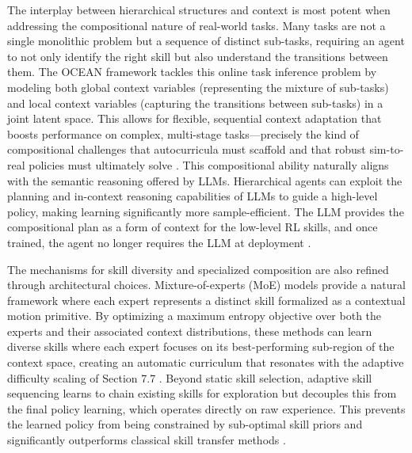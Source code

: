 \documentclass[11pt]{article}
\begin{document}
The interplay between hierarchical structures and context is most potent when addressing the compositional nature of real-world tasks. Many tasks are not a single monolithic problem but a sequence of distinct sub-tasks, requiring an agent to not only identify the right skill but also understand the transitions between them. The OCEAN framework tackles this online task inference problem by modeling both global context variables (representing the mixture of sub-tasks) and local context variables (capturing the transitions between sub-tasks) in a joint latent space. This allows for flexible, sequential context adaptation that boosts performance on complex, multi-stage tasks---precisely the kind of compositional challenges that autocurricula must scaffold and that robust sim-to-real policies must ultimately solve \cite{ref388}. This compositional ability naturally aligns with the semantic reasoning offered by LLMs. Hierarchical agents can exploit the planning and in-context reasoning capabilities of LLMs to guide a high-level policy, making learning significantly more sample-efficient. The LLM provides the compositional plan as a form of context for the low-level RL skills, and once trained, the agent no longer requires the LLM at deployment \cite{ref389}.

The mechanisms for skill diversity and specialized composition are also refined through architectural choices. Mixture-of-experts (MoE) models provide a natural framework where each expert represents a distinct skill formalized as a contextual motion primitive. By optimizing a maximum entropy objective over both the experts and their associated context distributions, these methods can learn diverse skills where each expert focuses on its best-performing sub-region of the context space, creating an automatic curriculum that resonates with the adaptive difficulty scaling of Section 7.7 \cite{ref390}. Beyond static skill selection, adaptive skill sequencing learns to chain existing skills for exploration but decouples this from the final policy learning, which operates directly on raw experience. This prevents the learned policy from being constrained by sub-optimal skill priors and significantly outperforms classical skill transfer methods \cite{ref391}.
\end{document}
